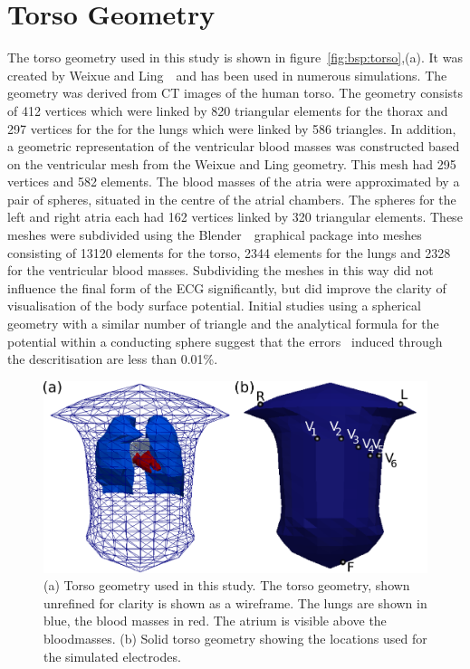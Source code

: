 \section{Torso Geometry}

The torso geometry used in this study is shown in figure~\ref{fig:bsp:torso},(a).
It was created by Weixue and Ling~\cite{Weixue1993,Weixue1996}\ and has been
used in numerous simulations.
The geometry was derived from CT images of the human torso.
The geometry consists of 412 vertices which were linked by 820 triangular
elements for the thorax and 297 vertices for the for the lungs which were linked
by 586 triangles.
In addition, a geometric representation of the ventricular blood masses was
constructed based on the ventricular mesh from the Weixue and Ling geometry.
This mesh had 295 vertices and 582 elements.
The blood masses of the atria were approximated by a pair of spheres, situated
in the centre of the atrial chambers.
The spheres for the left and right atria each had 162 vertices linked by 320
triangular elements.
These meshes were subdivided using the Blender~\cite{Blender}\ graphical package
into meshes consisting of 13120 elements for the torso, 2344 elements for the
lungs and 2328 for the ventricular blood masses.
Subdividing the meshes in this way did not influence the final form of the ECG
significantly, but did improve the clarity of visualisation of the body surface
potential.
Initial studies using a spherical geometry with a similar number of triangle and
the analytical formula for the potential within a conducting sphere suggest that
the errors~\cite{Ferguson1997} induced through the descritisation are less
than 0.01\%.

\begin{figure}
\includegraphics{figures/bsp/thorax_layout}
\caption[Torso showing embedded atrium and lead locations]{
\label{bsp:fig:torso}
(a) Torso geometry used in this study.
The torso geometry, shown unrefined for clarity is shown as a wireframe.
The lungs are shown in blue, the blood masses in red.
The atrium is visible above the bloodmasses.
(b) Solid torso geometry showing the locations used for the simulated
electrodes.
}
\end{figure}

